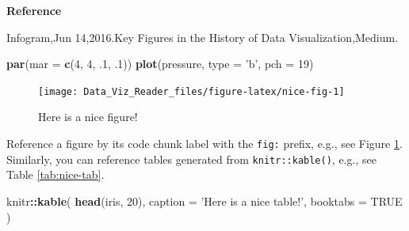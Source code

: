 \documentclass[]{book}
\newenvironment{Shaded}{\begin{snugshade}}{\end{snugshade}}
\newcommand{\KeywordTok}[1]{\textcolor[rgb]{0.13,0.29,0.53}{\textbf{#1}}}
\newcommand{\DataTypeTok}[1]{\textcolor[rgb]{0.13,0.29,0.53}{#1}}
\newcommand{\DecValTok}[1]{\textcolor[rgb]{0.00,0.00,0.81}{#1}}
\newcommand{\StringTok}[1]{\textcolor[rgb]{0.31,0.60,0.02}{#1}}
\newcommand{\OtherTok}[1]{\textcolor[rgb]{0.56,0.35,0.01}{#1}}
\newcommand{\OperatorTok}[1]{\textcolor[rgb]{0.81,0.36,0.00}{\textbf{#1}}}
\newcommand{\NormalTok}[1]{#1}
\theoremstyle{definition}
\theoremstyle{definition}
\theoremstyle{definition}
\theoremstyle{remark}
\begin{document}
\textbf{Reference}

Infogram,Jun 14,2016.Key Figures in the History of Data
Visualization,Medium.

\begin{Shaded}
\begin{Highlighting}[]
\KeywordTok{par}\NormalTok{(}\DataTypeTok{mar =} \KeywordTok{c}\NormalTok{(}\DecValTok{4}\NormalTok{, }\DecValTok{4}\NormalTok{, .}\DecValTok{1}\NormalTok{, .}\DecValTok{1}\NormalTok{))}
\KeywordTok{plot}\NormalTok{(pressure, }\DataTypeTok{type =} \StringTok{'b'}\NormalTok{, }\DataTypeTok{pch =} \DecValTok{19}\NormalTok{)}
\end{Highlighting}
\end{Shaded}

\begin{figure}

{\centering \texttt{[image: Data\_Viz\_Reader\_files/figure-latex/nice-fig-1]} 

}

\caption{Here is a nice figure!}\label{fig:nice-fig}
\end{figure}

Reference a figure by its code chunk label with the \texttt{fig:}
prefix, e.g., see Figure \ref{fig:nice-fig}. Similarly, you can
reference tables generated from \texttt{knitr::kable()}, e.g., see Table
\ref{tab:nice-tab}.

\begin{Shaded}
\begin{Highlighting}[]
\NormalTok{knitr}\OperatorTok{::}\KeywordTok{kable}\NormalTok{(}
  \KeywordTok{head}\NormalTok{(iris, }\DecValTok{20}\NormalTok{), }\DataTypeTok{caption =} \StringTok{'Here is a nice table!'}\NormalTok{,}
  \DataTypeTok{booktabs =} \OtherTok{TRUE}
\NormalTok{)}
\end{Highlighting}
\end{Shaded}
\end{document}

